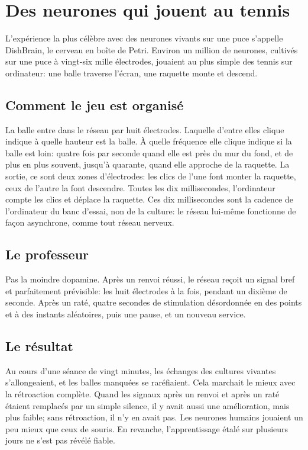 \chapter{Des neurones qui jouent au tennis}

L'expérience la plus célèbre avec des neurones vivants sur une puce s'appelle DishBrain, \og le cerveau en boîte de Petri\fg{}. Environ un million de neurones, cultivés sur une puce à vingt-six mille électrodes, jouaient au plus simple des tennis sur ordinateur: une balle traverse l'écran, une raquette monte et descend.

\section*{Comment le jeu est organisé}

La balle entre dans le réseau par huit électrodes. Laquelle d'entre elles clique indique à quelle hauteur est la balle. À quelle fréquence elle clique indique si la balle est loin: quatre fois par seconde quand elle est près du mur du fond, et de plus en plus souvent, jusqu'à quarante, quand elle approche de la raquette. La sortie, ce sont deux zones d'électrodes: les clics de l'une font monter la raquette, ceux de l'autre la font descendre. Toutes les dix millisecondes, l'ordinateur compte les clics et déplace la raquette. Ces dix millisecondes sont la cadence de l'ordinateur du banc d'essai, non de la culture: le réseau lui-même fonctionne de façon asynchrone, comme tout réseau nerveux.


\section*{Le professeur}

Pas la moindre dopamine. Après un renvoi réussi, le réseau reçoit un signal bref et parfaitement prévisible: les huit électrodes à la fois, pendant un dixième de seconde. Après un raté, quatre secondes de stimulation désordonnée en des points et à des instants aléatoires, puis une pause, et un nouveau service.

\section*{Le résultat}

Au cours d'une séance de vingt minutes, les échanges des cultures vivantes s'allongeaient, et les balles manquées se raréfiaient. Cela marchait le mieux avec la rétroaction complète. Quand les signaux après un renvoi et après un raté étaient remplacés par un simple silence, il y avait aussi une amélioration, mais plus faible; sans rétroaction, il n'y en avait pas. Les neurones humains jouaient un peu mieux que ceux de souris. En revanche, l'apprentissage étalé sur plusieurs jours ne s'est pas révélé fiable.

